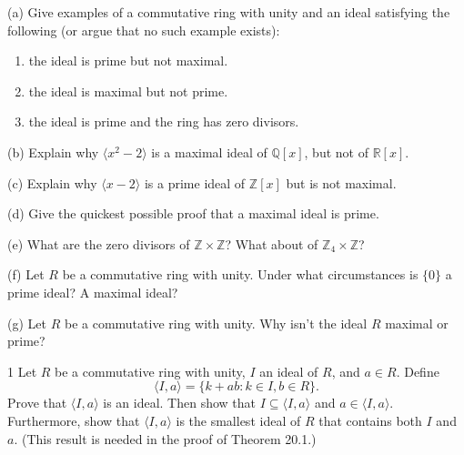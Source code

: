 \newpage
\begin{problem}[Warmup]{(a)}
    Give examples of a commutative ring with unity and an ideal satisfying the following (or argue that no such example exists):
    \begin{enumerate}
        \item[(a)] the ideal is prime but not maximal.
        \item[(b)] the ideal is maximal but not prime.
        \item[(c)] the ideal is prime and the ring has zero divisors.
    \end{enumerate}
\end{problem}
\unsolved

\begin{problem}[Warmup]{(b)}
    Explain why $\langle x^2 - 2 \rangle$ is a maximal ideal of $\mathbb{Q}[x]$, but not of $\mathbb{R}[x]$.
\end{problem}
\unsolved

\begin{problem}[Warmup]{(c)}
    Explain why $\langle x - 2 \rangle$ is a prime ideal of $\mathbb{Z}[x]$ but is not maximal.
\end{problem}
\unsolved

\begin{problem}[Warmup]{(d)}
    Give the quickest possible proof that a maximal ideal is prime.
\end{problem}
\unsolved

\begin{problem}[Warmup]{(e)}
    What are the zero divisors of $\mathbb{Z} \times \mathbb{Z}$? What about of $\mathbb{Z}_4 \times \mathbb{Z}$?
\end{problem}
\unsolved

\begin{problem}[Warmup]{(f)}
    Let $R$ be a commutative ring with unity. Under what circumstances is $\{0\}$ a prime ideal? A maximal ideal?
\end{problem}
\unsolved

\begin{problem}[Warmup]{(g)}
    Let $R$ be a commutative ring with unity. Why isn't the ideal $R$ maximal or prime?
\end{problem}
\unsolved

\begin{problem}{1}
    Let $R$ be a commutative ring with unity, $I$ an ideal of $R$, and $a \in R$. Define
    \[\langle I, a \rangle = \{k + ab : k \in I, b \in R\}.\]
    Prove that $\langle I, a \rangle$ is an ideal. Then show that
    $I \subseteq \langle I, a \rangle$ and $a \in \langle I, a \rangle$. Furthermore, show
    that $\langle I, a \rangle$ is the smallest ideal of $R$ that contains both $I$ and
    $a$. (This result is needed in the proof of Theorem 20.1.)
\end{problem}
\unsolved

